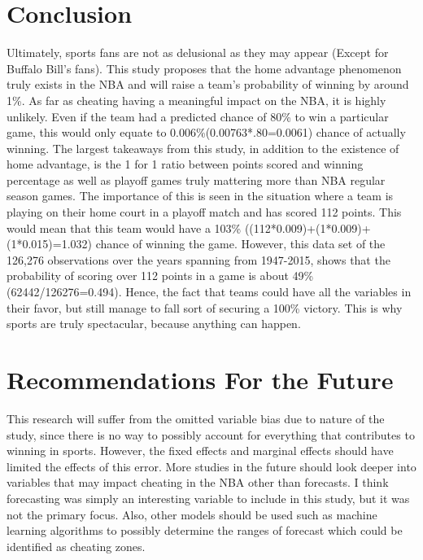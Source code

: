 \documentclass[12pt,english]{article}
\begin{document}
\section{Conclusion}\label{sec:conclusion}

Ultimately, sports fans are not as delusional as they may appear (Except for Buffalo Bill's fans). This study proposes that the home advantage phenomenon truly exists in the NBA and will raise a team's probability of winning by around 1\%. As far as cheating having a meaningful impact on the NBA, it is highly unlikely. Even if the team had a predicted chance of 80\% to win a particular game, this would only equate to 0.006\%(0.00763*.80=0.0061) chance of actually winning. The largest takeaways from this study, in addition to the existence of home advantage, is the 1 for 1 ratio between points scored and winning percentage as well as playoff games truly mattering more than NBA regular season games. The importance of this is seen in the situation where a team is playing on their home court in a playoff match and has scored 112 points. This would mean that this team would have a 103\% ((112*0.009)+(1*0.009)+(1*0.015)=1.032) chance of winning the game. However, this data set of the 126,276 observations over the years spanning from 1947-2015, shows that the probability of scoring over 112 points in a game is about 49\% (62442/126276=0.494). Hence, the fact that teams could have all the variables in their favor, but still manage to fall sort of  securing a 100\%  victory. This is why sports are truly spectacular, because anything can happen.  

\section{Recommendations For the Future}\label{sec:conclusion}
This research will suffer from the omitted variable bias due to nature of the study, since there is no way to possibly account for everything that contributes to winning in sports. However, the fixed effects and marginal effects should have limited the effects of this error. More studies in the future should look deeper into variables that may impact cheating in the NBA other than forecasts. I think forecasting was simply an interesting variable to include in this study, but it was not the primary focus. Also, other models should be used such as machine learning algorithms to possibly determine the ranges of forecast which could be identified as cheating zones. 
\vfill
\pagebreak{}
\begin{spacing}{1.0}


\end{spacing}
\end{document}
